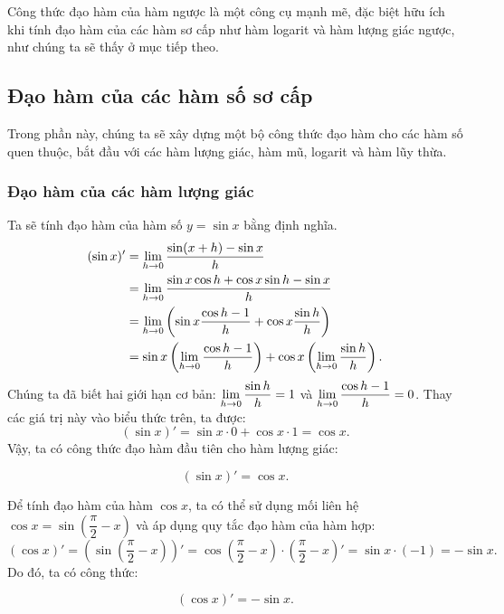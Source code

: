Công thức đạo hàm của hàm ngược là một công cụ mạnh mẽ, đặc biệt hữu ích khi tính đạo hàm của các hàm sơ cấp như hàm logarit và hàm lượng giác ngược, như chúng ta sẽ thấy ở mục tiếp theo.

\subsection{Đạo hàm của các hàm số sơ cấp}

Trong phần này, chúng ta sẽ xây dựng một bộ công thức đạo hàm cho các hàm số quen thuộc, bắt đầu với các hàm lượng giác, hàm mũ, logarit và hàm lũy thừa.

\subsubsection{Đạo hàm của các hàm lượng giác}

\begin{example}
    Ta sẽ tính đạo hàm của hàm số $y = \sin x$ bằng định nghĩa.
    \begin{align*}
        (\sin x)' &= \lim\limits_{h \to 0} \dfrac{\sin(x+h) - \sin x}{h} \\
        &= \lim\limits_{h \to 0} \dfrac{\sin x \cos h + \cos x \sin h - \sin x}{h} \\
        &= \lim\limits_{h \to 0} \left( \sin x \dfrac{\cos h - 1}{h} + \cos x \dfrac{\sin h}{h} \right) \\
        &= \sin x \left( \lim\limits_{h \to 0} \dfrac{\cos h - 1}{h} \right) + \cos x \left( \lim\limits_{h \to 0} \dfrac{\sin h}{h} \right).
    \end{align*}
    Chúng ta đã biết hai giới hạn cơ bản: $\lim\limits_{h \to 0} \dfrac{\sin h}{h} = 1$ và $\lim\limits_{h \to 0} \dfrac{\cos h - 1}{h} = 0$. Thay các giá trị này vào biểu thức trên, ta được:
    \[ (\sin x)' = \sin x \cdot 0 + \cos x \cdot 1 = \cos x. \]
    Vậy, ta có công thức đạo hàm đầu tiên cho hàm lượng giác:
    \begin{importantbox}
        \[ (\sin x)' = \cos x. \]
    \end{importantbox}
\end{example}

\begin{example}
    Để tính đạo hàm của hàm $\cos x$, ta có thể sử dụng mối liên hệ $\cos x = \sin\left(\dfrac{\pi}{2} - x\right)$ và áp dụng quy tắc đạo hàm của hàm hợp:
    \[ (\cos x)' = \left( \sin\left(\dfrac{\pi}{2} - x\right) \right)' = \cos\left(\dfrac{\pi}{2} - x\right) \cdot \left(\dfrac{\pi}{2} - x\right)' = \sin x \cdot (-1) = -\sin x. \]
    Do đó, ta có công thức:
    \begin{importantbox}
        \[ (\cos x)' = -\sin x. \]
    \end{importantbox}
\end{example}

